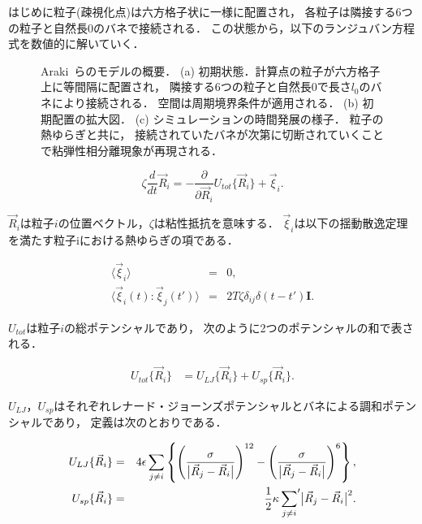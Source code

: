 はじめに粒子(疎視化点)は六方格子状に一様に配置され，
各粒子は隣接する6つの粒子と自然長$0$のバネで接続される．
この状態から，以下のランジュバン方程式を数値的に解いていく．


\begin{figure}
\centering

\caption{
    Araki~\cite{araki2005simple}らのモデルの概要．
    (a) 初期状態．計算点の粒子が六方格子上に等間隔に配置され，
        隣接する6つの粒子と自然長$0$で長さ$l_0$のバネにより接続される．
        空間は周期境界条件が適用される．
    (b) 初期配置の拡大図．
    (c) シミュレーションの時間発展の様子．
        粒子の熱ゆらぎと共に，
        接続されていたバネが次第に切断されていくことで粘弾性相分離現象が再現される．
}
\label{fig:model_2d}
\end{figure}


\begin{equation}
\label{eq:main}
\zeta
\frac{d}{dt}
\vec{R}_i
=
-\frac{\partial}{\partial\vec{R}_i}
U_{tot}\{\vec{R}_i\}
+\vec{\xi}_i
.
\end{equation}

$\vec{R}_i$は粒子$i$の位置ベクトル，$\zeta$は粘性抵抗を意味する．
$\vec{\xi}_i$は以下の揺動散逸定理を満たす粒子iにおける熱ゆらぎの項である．

\begin{eqnarray}
\label{eq:langevin0}
\langle\vec{\xi}_i\rangle &=& 0, \\
\label{eq:langevin1}
\langle\vec{\xi}_i(t):\vec{\xi}_j(t')\rangle &=& 2T\zeta\delta_{ij}\delta(t-t')\bm{I}.
\end{eqnarray}

$U_{tot}$は粒子$i$の総ポテンシャルであり，
次のように2つのポテンシャルの和で表される．

\begin{eqnarray}
U_{tot}\{\vec{R}_i\}
&=
 U_{LJ}\{\vec{R}_i\}
+U_{sp}\{\vec{R}_i\}.
\end{eqnarray}

$U_{LJ}$，$U_{sp}$はそれぞれレナード・ジョーンズポテンシャルとバネによる調和ポテンシャルであり，
定義は次のとおりである．

\begin{eqnarray}
U_{LJ}\{\vec{R}_i\}
&=&
4\epsilon\sum_{j\neq i}
\left\{
\left(
\frac{\sigma}{\bigl|\vec{R}_j-\vec{R}_i\bigr|}
\right)^{12}
-
\left(
\frac{\sigma}{\bigl|\vec{R}_j-\vec{R}_i\bigr|}
\right)^{6}
\right\},
\\
U_{sp}\{\vec{R}_i\}
&=&
\frac{1}{2}
\kappa
\sideset{}{'}\sum_{j\neq i}
\bigl|\vec{R}_j-\vec{R}_i\bigr|^{2}.
\end{eqnarray}

